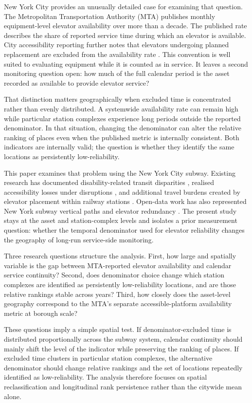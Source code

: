 New York City provides an unusually detailed case for examining that question. The Metropolitan Transportation Authority (MTA) publishes monthly equipment-level elevator availability over more than a decade. The published rate describes the share of reported service time during which an elevator is available. City accessibility reporting further notes that elevators undergoing planned replacement are excluded from the availability rate \citep{mopd2025}. This convention is well suited to evaluating equipment while it is counted as in service. It leaves a second monitoring question open: how much of the full calendar period is the asset recorded as available to provide elevator service?

That distinction matters geographically when excluded time is concentrated rather than evenly distributed. A systemwide availability rate can remain high while particular station complexes experience long periods outside the reported denominator. In that situation, changing the denominator can alter the relative ranking of places even when the published metric is internally consistent. Both indicators are internally valid; the question is whether they identify the same locations as persistently low-reliability.

This paper examines that problem using the New York City subway. Existing research has documented disability-related transit disparities \citep{liu2023}, realised accessibility losses under disruptions \citep{liu2024}, and additional travel burdens created by elevator placement within railway stations \citep{arai2026}. Open-data work has also represented New York subway vertical paths and elevator redundancy \citep{twosigma2020}. The present study stays at the asset and station-complex levels and isolates a prior measurement question: whether the temporal denominator used for elevator reliability changes the geography of long-run service-side monitoring.

Three research questions structure the analysis. First, how large and spatially variable is the gap between MTA-reported elevator availability and calendar service continuity? Second, does denominator choice change which station complexes are identified as persistently low-reliability locations, and are those relative rankings stable across years? Third, how closely does the asset-level geography correspond to the MTA's separate accessible-platform availability metric at borough scale?

These questions imply a simple spatial test. If denominator-excluded time is distributed proportionally across the subway system, calendar continuity should mainly shift the level of the indicator while preserving the ranking of places. If excluded time clusters in particular station complexes, the alternative denominator should change relative rankings and the set of locations repeatedly identified as low-reliability. The analysis therefore focuses on spatial reclassification and longitudinal rank persistence rather than the citywide mean alone.

